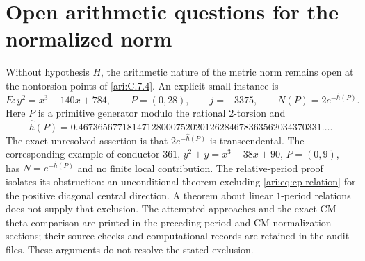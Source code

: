 \section{Open arithmetic questions for the normalized norm}\label{ari:open:norm}



Without hypothesis $H$, the arithmetic nature of the metric norm remains open at the
nontorsion points of \cref{ari:C.7.4}. An explicit small instance is
\[
 E:y^2=x^3-140x+784,\qquad P=(0,28),\qquad j=-3375,
 \qquad N(P)=2e^{-\widehat h(P)}.
\]
Here $P$ is a primitive generator modulo the rational
$2$-torsion and
\[
 \widehat h(P)=
 0.46736567718147128000752020126284678363562034370331\ldots.
\]
The exact unresolved assertion is that $2e^{-\widehat h(P)}$
is transcendental. The corresponding example of conductor
$361$, $y^2+y=x^3-38x+90$, $P=(0,9)$, has
$N=e^{-\widehat h(P)}$ and no finite local contribution.
The relative-period proof isolates its obstruction: an
unconditional theorem excluding
\eqref{ari:eq:cp-relation} for the positive diagonal central
direction. A theorem about linear $1$-period relations
does not supply that exclusion. The attempted approaches and the exact CM theta comparison are printed in the preceding period and CM-normalization sections;
their source checks and computational records are retained in the audit files.
These arguments do not resolve the stated exclusion.

\clearpage
